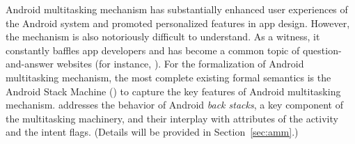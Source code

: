 Android multitasking mechanism has substantially enhanced user experiences of the Android system and promoted personalized features in app design. However, the mechanism is also notoriously difficult to understand. As a witness, it constantly baffles app developers and has become a common topic of question-and-answer websites (for instance, \cite{stackoverflow}).
%
%
For the formalization of Android multitasking mechanism, the most complete existing formal semantics is the Android Stack Machine ({\AMASS}) \cite{HC+19} to capture the key features of Android multitasking mechanism. {\AMASS} addresses the behavior of Android \emph{back stacks}, a key component of the multitasking machinery, and their interplay with attributes of the activity and the intent flags. 
(Details will be provided in Section~\ref{sec:amm}.)

